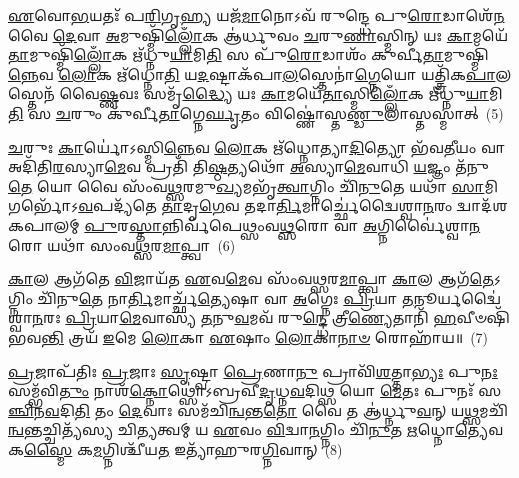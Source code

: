 \-\ul{𑌏}\-𑌵𑍋\-\ul{𑌭}\-𑌯𑌤𑌃᳴ 𑌪\-\ul{𑌰𑌿}\-𑌗𑍃\-\ul{𑌹𑍍𑌯} 𑌯𑌜᳴\-\ul{𑌮𑌾}\-𑌨𑍋\-𑌽𑌵᳴ 𑌰𑍁𑌨𑍍𑌦𑍍𑌧𑍇 𑌪𑍁\-\ul{𑌰𑍋}\-𑌡𑌾𑌶𑍇᳴\-\ul{𑌨} 𑌵𑍈 \ul{𑌦𑍇}\-𑌵𑌾 \ul{𑌅}\-𑌮𑍁𑌷𑍍𑌮𑌿᳴\-\ul{𑌲𑍍𑌲𑍋𑌁}\-𑌕 𑌆॑𑌰𑍍𑌧𑍁𑌵𑌂 \ul{𑌚}\-𑌰𑍁\-\ul{𑌣𑌾}\-𑌸𑍍𑌮𑌿𑌨𑍍 𑌯𑌃 \ul{𑌕𑌾}\-𑌮𑌯𑍇᳴\-\ul{𑌤𑌾}\-𑌮𑍁𑌷𑍍𑌮𑌿᳴\-\ul{𑌲𑍍𑌲𑍋𑌁}\-𑌕 𑌋᳴𑌧𑍍𑌨𑍁\-\ul{𑌯𑌾}\-𑌮𑌿\-\ul{𑌤𑌿} 𑌸 𑌪𑍁᳴\-\ul{𑌰𑍋}\-𑌡𑌾𑌶𑌂᳴ 𑌕𑍁𑌰𑍍𑌵𑍀\-\ul{𑌤𑌾}\-𑌮𑍁𑌷𑍍𑌮𑌿᳴\-\ul{𑌨𑍍𑌨𑍇}\-𑌵 \ul{𑌲𑍋}\-𑌕 𑌋᳴𑌧𑍍𑌨𑍋\-\ul{𑌤𑌿} 𑌯\-\ul{𑌦}\-𑌷𑍍𑌟𑌾𑌕᳴𑌪𑌾\-\ul{𑌲}\-𑌸𑍍𑌤𑍇𑌨𑌾॑\-\ul{𑌗𑍍𑌨𑍇}\-𑌯𑍋 𑌯𑌤𑍍𑌤𑍍𑌰𑌿᳴𑌕\-\ul{𑌪𑌾}\-𑌲𑌸𑍍𑌤𑍇𑌨᳴ 𑌵𑍈\-\ul{𑌷𑍍𑌣}\-𑌵𑌃 𑌸𑌮𑍃᳴\-\ul{𑌦𑍍𑌧𑍍𑌯𑍈} 𑌯𑌃 \ul{𑌕𑌾}\-𑌮𑌯𑍇᳴\-\ul{𑌤𑌾}\-𑌸𑍍𑌮𑌿\-\ul{𑌲𑍍𑌲𑍋𑌁}\-𑌕 𑌋᳴𑌧𑍍𑌨𑍁\-\ul{𑌯𑌾}\-𑌮𑌿\-\ul{𑌤𑌿} 𑌸 \ul{𑌚}\-𑌰𑍁𑌂 𑌕𑍁᳴𑌰𑍍𑌵𑍀\-\ul{𑌤𑌾}\-𑌗𑍍𑌨𑍇\-\ul{𑌰𑍍𑌘𑍃}\-𑌤𑌂 𑌵𑌿𑌷𑍍𑌣𑍋॑𑌸𑍍𑌤\-\ul{𑌣𑍍𑌡𑍁}\-𑌲𑌾𑌸𑍍𑌤𑌸𑍍𑌮𑌾॑𑌤𑍍~(5)

\-\ul{𑌚}\-𑌰𑍁𑌃 \ul{𑌕𑌾}\-𑌰𑍍𑌯𑍋॑\-𑌽𑌸𑍍𑌮𑌿\-\ul{𑌨𑍍𑌨𑍇}\-𑌵 \ul{𑌲𑍋}\-𑌕 𑌋᳴𑌧𑍍𑌨𑍋𑌤𑍍𑌯𑌾\-\ul{𑌦𑌿}\-𑌤𑍍𑌯𑍋 𑌭᳴𑌵\-\ul{𑌤𑍀}\-𑌯𑌂 𑌵𑌾 𑌅𑌦𑌿᳴𑌤𑌿\-\ul{𑌰}\-𑌸𑍍𑌯𑌾\-\ul{𑌮𑍇}\-𑌵 𑌪𑍍𑌰𑌤𑌿᳴ 𑌤𑌿\-\ul{𑌷𑍍𑌠}\-𑌤𑍍𑌯𑌥𑍋᳴ \ul{𑌅}\-𑌸𑍍𑌯𑌾\-\ul{𑌮𑍇}\-𑌵𑌾𑌧𑌿᳴ \ul{𑌯}\-𑌜𑍍𑌞𑌂 𑌤᳴𑌨𑍁\-\ul{𑌤𑍇} 𑌯𑍋 𑌵𑍈 𑌸𑌂᳴𑌵\-\ul{𑌥𑍍𑌸}\-𑌰𑌮𑍁\-\ul{𑌖𑍍𑌯}\-𑌮𑌭𑍃᳴\-\ul{𑌤𑍍𑌵𑌾}\-𑌗𑍍𑌨𑌿𑌂 𑌚𑌿᳴\-\ul{𑌨𑍁}\-𑌤𑍇 𑌯𑌥𑌾᳴ \ul{𑌸𑌾}\-𑌮𑌿 𑌗𑌰𑍍𑌭𑍋᳴\-𑌽\-\ul{𑌵}\-𑌪𑌦𑍍𑌯᳴𑌤𑍇 \ul{𑌤𑌾}\-𑌦𑍃\-\ul{𑌗𑍇}\-𑌵 𑌤𑌦𑌾\-\ul{𑌰𑍍𑌤𑌿}\-𑌮𑌾𑌰𑍍𑌚𑍍𑌛𑍇॑𑌦𑍍𑌵𑍈𑌶𑍍𑌵𑌾\-\ul{𑌨}\-𑌰𑌂 𑌦𑍍𑌵𑌾𑌦᳴𑌶\-𑌕𑌪𑌾𑌲𑌮𑍍 \ul{𑌪𑍁}\-𑌰\-\ul{𑌸𑍍𑌤𑌾}\-𑌨𑍍𑌨𑌿𑌰𑍍𑌵᳴𑌪𑍇𑌥𑍍𑌸𑌂𑌵\-\ul{𑌥𑍍𑌸}\-𑌰𑍋 𑌵𑌾 \ul{𑌅}\-𑌗𑍍𑌨𑌿𑌰𑍍𑌵𑍈॑𑌶𑍍𑌵𑌾\-\ul{𑌨}\-𑌰𑍋 𑌯𑌥𑌾᳴ 𑌸𑌂𑌵\-\ul{𑌥𑍍𑌸}\-𑌰\-\ul{𑌮𑌾}\-𑌪𑍍𑌤𑍍𑌵𑌾~(6)

\-\ul{𑌕𑌾}\-𑌲 𑌆𑌗᳴𑌤𑍇 \ul{𑌵𑌿}\-𑌜𑌾𑌯᳴𑌤 \ul{𑌏}\-𑌵\-\ul{𑌮𑍇}\-𑌵 𑌸𑌂᳴𑌵\-\ul{𑌥𑍍𑌸}\-𑌰\-\ul{𑌮𑌾}\-𑌪𑍍𑌤𑍍𑌵𑌾 \ul{𑌕𑌾}\-𑌲 𑌆𑌗᳴\-\ul{𑌤𑍇}\-\-𑌽𑌗𑍍𑌨𑌿𑌂 𑌚𑌿᳴𑌨𑍁\-\ul{𑌤𑍇} 𑌨𑌾\-\ul{𑌰𑍍𑌤𑌿}\-𑌮𑌾𑌰𑍍𑌚𑍍𑌛᳴\-\ul{𑌤𑍍𑌯𑍇}\-𑌷𑌾 𑌵𑌾 \ul{𑌅}\-𑌗𑍍𑌨𑍇𑌃 \ul{𑌪𑍍𑌰𑌿}\-𑌯𑌾 \ul{𑌤}\-𑌨𑍂𑌰𑍍𑌯𑌦𑍍𑌵𑍈॑𑌶𑍍𑌵𑌾\-\ul{𑌨}\-𑌰𑌃 \ul{𑌪𑍍𑌰𑌿}\-𑌯𑌾\-\ul{𑌮𑍇}\-𑌵𑌾𑌸𑍍𑌯᳴ \ul{𑌤}\-𑌨𑍁\-\ul{𑌵}\-𑌮𑌵᳴ 𑌰𑍁\-\ul{𑌨𑍍𑌦𑍍𑌧𑍇} 𑌤𑍍𑌰𑍀\-\ul{𑌣𑍍𑌯𑍇}\-𑌤𑌾𑌨𑌿᳴ \ul{𑌹}\-𑌵𑍀𑍞𑌷𑌿᳴ 𑌭𑌵\-\ul{𑌨𑍍𑌤𑌿} 𑌤𑍍𑌰𑌯᳴ \ul{𑌇}\-𑌮𑍇 \ul{𑌲𑍋}\-𑌕𑌾 \ul{𑌏}\-𑌷𑌾𑌂 \ul{𑌲𑍋}\-𑌕𑌾\-\ul{𑌨𑌾}\-\-\ul{𑍞} 𑌰𑍋𑌹𑌾᳴𑌯॥~(7)

{\anuvakamend[{\-\ul{𑌯}\-𑌦𑍍𑌰𑌿𑌯᳴\-\ul{𑌙𑍍𑌵𑌾}\-𑌯𑍁𑌰𑍍𑌯𑌚𑍍𑌛𑍍𑌮᳴\-\ul{𑌶𑍍𑌰𑍁}\-𑌣𑌸𑍍𑌤\-\ul{𑌦𑍍𑌵𑌾}\-𑌯𑍋\-\ul{𑌰𑍍𑌨𑌿}\-𑌰𑍍𑌵𑌪᳴𑌤𑌿 \ul{𑌦𑍇}\-𑌵\-\ul{𑌤𑌾}\-𑌸𑍍𑌤𑌸𑍍𑌮𑌾᳴\-\ul{𑌦𑌾}\-𑌪𑍍𑌤𑍍𑌵𑌾𑌷𑍍𑌟𑌾𑌤𑍍𑌰𑌿𑍞᳴𑌶𑌚𑍍𑌚}]}%

\-\ul{𑌪𑍍𑌰}\-𑌜𑌾𑌪᳴𑌤𑌿𑌃 \ul{𑌪𑍍𑌰}\-𑌜𑌾𑌃 \ul{𑌸𑍃}\-𑌷𑍍𑌟𑍍𑌵𑌾 \ul{𑌪𑍍𑌰𑍇}\-𑌣𑌾\-\ul{𑌨𑍁} 𑌪𑍍𑌰𑌾𑌵𑌿᳴\-\ul{𑌶}\-𑌤𑍍𑌤𑌾\-\ul{𑌭𑍍𑌯𑌃} 𑌪𑍁\-\ul{𑌨𑌃} 𑌸𑌮𑍍𑌭᳴𑌵𑌿\-\ul{𑌤𑍁𑌂} 𑌨𑌾𑌶᳴\-\ul{𑌕𑍍𑌨𑍋}\-𑌥𑍍𑌸𑍋॑\-𑌽𑌬𑍍𑌰𑌵𑍀\-\ul{𑌦𑍃}\-𑌧𑍍𑌨\-\ul{𑌵}\-𑌦𑌿𑌥𑍍𑌸 𑌯𑍋 \ul{𑌮𑍇}\-𑌤𑌃 𑌪𑍁𑌨𑌃᳴ 𑌸\-\ul{𑌞𑍍𑌚𑌿}\-𑌨\-\ul{𑌵}\-𑌦𑌿\-\ul{𑌤𑌿} 𑌤𑌂 \ul{𑌦𑍇}\-𑌵𑌾𑌃 𑌸𑌮᳴𑌚𑌿\-\ul{𑌨𑍍𑌵}\-𑌨𑍍𑌤\-\ul{𑌤𑍋} 𑌵𑍈 𑌤 𑌆॑𑌰𑍍𑌧𑍍𑌨𑍁\-\ul{𑌵}\-𑌨𑍍 𑌯\-\ul{𑌥𑍍𑌸}\-𑌮𑌚𑌿᳴\-\ul{𑌨𑍍𑌵}\-𑌨𑍍𑌤𑌚𑍍𑌚𑌿𑌤𑍍𑌯᳴𑌸𑍍𑌯 𑌚𑌿\-\ul{𑌤𑍍𑌯}\-𑌤𑍍𑌵𑌮𑍍 𑌯 \ul{𑌏}\-𑌵𑌂 \ul{𑌵𑌿}\-𑌦𑍍𑌵𑌾\-\ul{𑌨}\-𑌗𑍍𑌨𑌿𑌂 𑌚𑌿᳴\-\ul{𑌨𑍁}\-𑌤 \ul{𑌋}\-𑌧𑍍𑌨𑍋\-\ul{𑌤𑍍𑌯𑍇}\-𑌵 𑌕\-\ul{𑌸𑍍𑌮𑍈} 𑌕\-\ul{𑌮}\-𑌗𑍍𑌨𑌿𑌶𑍍𑌚𑍀᳴𑌯\-\ul{𑌤} 𑌇𑌤𑍍𑌯𑌾᳴𑌹𑍁𑌰\-\ul{𑌗𑍍𑌨𑌿}\-𑌵𑌾𑌨𑍍~(8)

